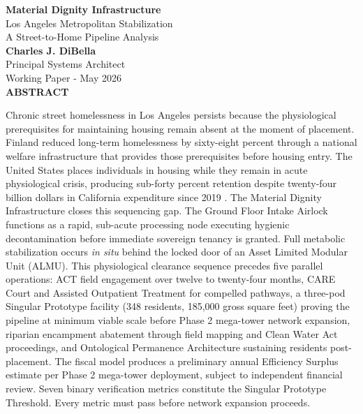 \documentclass[12pt, letterpaper]{article}
\begin{document}
\captionsetup[table]{labelfont=normalfont, labelsep=period, skip=6pt}

\begin{titlepage}
\begin{center}
{\LARGE \textbf{Material Dignity Infrastructure}}\\[6pt]
{\large Los Angeles Metropolitan Stabilization\\[2pt]
A Street-to-Home Pipeline Analysis}\\[1.0cm]
{\normalsize \textbf{Charles J. DiBella}}\\[0.01cm]
{\normalsize Principal Systems Architect}\\[0.01cm]
{\normalsize Working Paper - May 2026}\\[0.5cm]
\textbf{ABSTRACT}
\vspace{0.5cm}
\end{center}
\begin{minipage}{0.95\textwidth}
\noindent

Chronic street homelessness in Los Angeles persists because the physiological prerequisites for maintaining housing remain absent at the moment of placement. Finland reduced long-term homelessness by sixty-eight percent through a national welfare infrastructure that provides those prerequisites before housing entry. The United States places individuals in housing while they remain in acute physiological crisis, producing sub-forty percent retention despite twenty-four billion dollars in California expenditure since 2019 \citep{ca_24b_expenditure_2024}. The Material Dignity Infrastructure closes this sequencing gap. The Ground Floor Intake Airlock functions as a rapid, sub-acute processing node executing hygienic decontamination before immediate sovereign tenancy is granted. Full metabolic stabilization occurs \textit{in situ} behind the locked door of an Asset Limited Modular Unit (ALMU). This physiological clearance sequence precedes five parallel operations: ACT field engagement over twelve to twenty-four months, CARE Court and Assisted Outpatient Treatment for compelled pathways, a three-pod Singular Prototype facility (348 residents, 185,000 gross square feet) proving the pipeline at minimum viable scale before Phase 2 mega-tower network expansion, riparian encampment abatement through field mapping and Clean Water Act proceedings, and Ontological Permanence Architecture sustaining residents post-placement. The fiscal model produces a preliminary annual Efficiency Surplus estimate per Phase 2 mega-tower deployment, subject to independent financial review. Seven binary verification metrics constitute the Singular Prototype Threshold. Every metric must pass before network expansion proceeds.
\end{minipage}
\end{titlepage}
\end{document}

